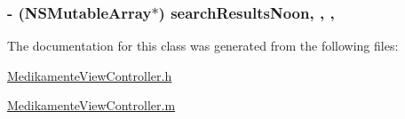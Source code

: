 \subsubsection[{search\+Results\+Noon}]{\setlength{\rightskip}{0pt plus 5cm}-\/ (N\+S\+Mutable\+Array$\ast$) search\+Results\+Noon\hspace{0.3cm}{\ttfamily [read]}, {\ttfamily [write]}, {\ttfamily [nonatomic]}, {\ttfamily [strong]}}\label{interface_medikamente_view_controller_a5ffb2b731a04e9ddbf394fb56694e8df}


The documentation for this class was generated from the following files\+:\begin{DoxyCompactItemize}
\item 
\hyperlink{_medikamente_view_controller_8h}{Medikamente\+View\+Controller.\+h}\item 
\hyperlink{_medikamente_view_controller_8m}{Medikamente\+View\+Controller.\+m}\end{DoxyCompactItemize}
